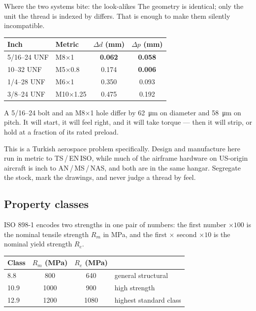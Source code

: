 \documentclass[11pt,a4paper]{article}
\begin{document}
\begin{aerobox}{Where the two systems bite: the look-alikes}
The geometry is identical; only the unit the thread is indexed by differs. That is enough to make
them silently incompatible.

\begin{center}\small
\begin{tabular}{@{}llcc@{}}
\toprule
Inch & Metric & $\Delta d$ (\si{mm}) & $\Delta p$ (\si{mm})\\
\midrule
5/16--24 UNF & M8$\times$1 & \textbf{0.062} & \textbf{0.058}\\
10--32 UNF & M5$\times$0.8 & 0.174 & \textbf{0.006}\\
1/4--28 UNF & M6$\times$1 & 0.350 & 0.093\\
3/8--24 UNF & M10$\times$1.25 & 0.475 & 0.192\\
\bottomrule
\end{tabular}
\end{center}

\medskip
A 5/16--24 bolt and an M8$\times$1 hole differ by \SI{62}{\micro\metre} on diameter and
\SI{58}{\micro\metre} on pitch. It will start, it will feel right, and it will take torque --- then it
will strip, or hold at a fraction of its rated preload.

\medskip
This is a Turkish aerospace problem specifically. Design and manufacture here run in metric to
TS\,/\,EN\,ISO, while much of the airframe hardware on US-origin aircraft is inch to AN\,/\,MS\,/\,NAS,
and both are in the same hangar. Segregate the stock, mark the drawings, and never judge a thread by
feel.
\end{aerobox}

\subsection{Property classes}

ISO 898-1 encodes two strengths in one pair of numbers: the first number $\times100$ is the nominal
tensile strength $R_m$ in \si{MPa}, and the first $\times$ second $\times10$ is the nominal yield
strength $R_e$.

\begin{center}\small
\begin{tabular}{@{}lccl@{}}
\toprule
Class & $R_m$ (\si{MPa}) & $R_e$ (\si{MPa}) & \\
\midrule
8.8 & 800 & 640 & general structural\\
10.9 & 1000 & 900 & high strength\\
12.9 & 1200 & 1080 & highest standard class\\
\bottomrule
\end{tabular}
\end{center}
\end{document}
